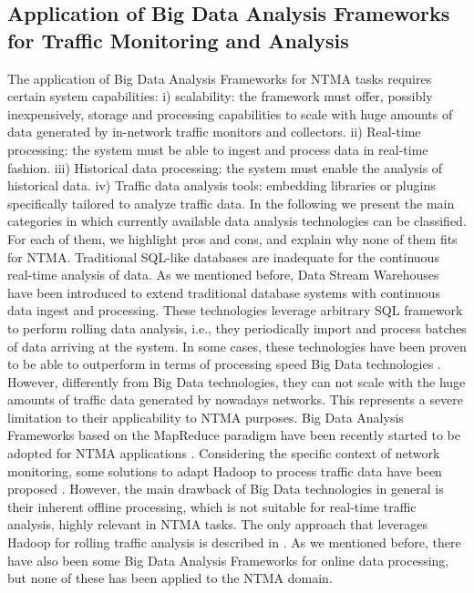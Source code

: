 \documentclass[10pt, conference, letterpaper]{IEEEtran}
\begin{document}
\subsection{Application of Big Data Analysis Frameworks for Traffic Monitoring and Analysis}

The application of Big Data Analysis Frameworks for NTMA tasks requires certain system capabilities: i) scalability: the framework must offer, possibly inexpensively, storage and processing capabilities to scale with huge amounts of data generated by in-network traffic monitors and collectors. ii) Real-time processing: the system must be able to ingest and process data in real-time fashion. iii) Historical data processing: the system must enable the analysis of historical data. iv) Traffic data analysis tools: embedding libraries or plugins specifically tailored to analyze traffic data. In the following we present the main categories in which currently available data analysis technologies can be classified. For each of them, we highlight pros and cons, and explain why none of them fits for NTMA. Traditional SQL-like databases are inadequate for the continuous real-time analysis of data. As we mentioned before, Data Stream Warehouses have been introduced to extend traditional database systems with continuous data ingest and processing. These technologies leverage arbitrary SQL framework to perform rolling data analysis, i.e., they periodically import and process batches of data arriving at the system. In some cases, these technologies have been proven to be able to outperform in terms of processing speed Big Data technologies \cite{baer2014}. However, differently from Big Data technologies, they can not scale with the huge amounts of traffic data generated by nowadays networks. This represents a severe limitation to their applicability to NTMA purposes. Big Data Analysis Frameworks based on the MapReduce paradigm have been recently started to be adopted for NTMA applications \cite{fontugne2014}. Considering the specific context of network monitoring, some solutions to adapt Hadoop to process traffic data have been proposed \cite{hadoopntma2012}. However, the main drawback of Big Data technologies in general is their inherent offline processing, which is not suitable for real-time traffic analysis, highly relevant in NTMA tasks. The only approach that leverages Hadoop for rolling traffic analysis is described in \cite{liu2014}. As we mentioned before, there have also been some Big Data Analysis Frameworks for online data processing, but none of these has been applied to the NTMA domain.
\end{document}
